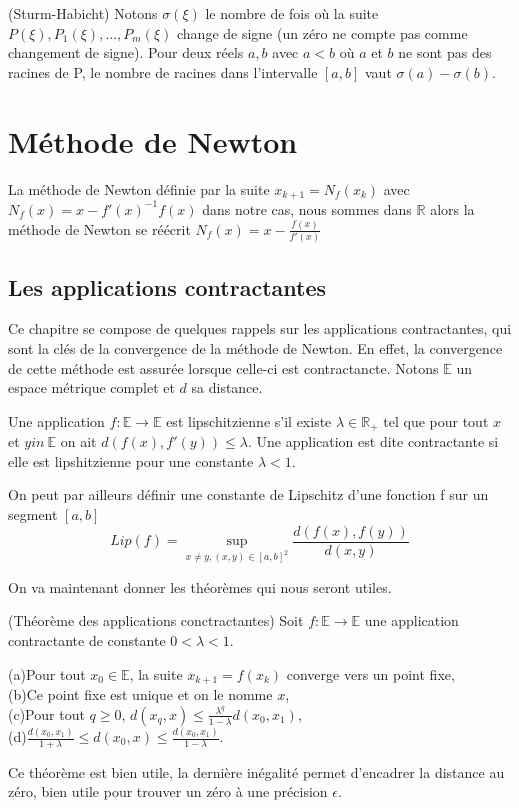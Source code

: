 \documentclass[a4paper,10.5pt]{article}
\begin{document}
	\begin{theorem}(Sturm-Habicht)
		Notons $\sigma(\xi)$ le nombre de fois où la suite $P(\xi),P_{1}(\xi),...,P_{m}(\xi)$ change de signe (un zéro ne compte pas comme changement de signe).
		Pour deux réels $a,b$ avec $a<b$ où $a$ et $b$ ne sont pas des racines de P, le nombre de racines dans l'intervalle $[a,b]$ vaut
		$\sigma(a)-\sigma(b)$.
	\end{theorem}
	
	\section{Méthode de Newton}
	
	La méthode de Newton définie par la suite $x_{k+1}=N_{f}(x_{k})$ avec $N_{f}(x)=x-f'(x)^{-1}f(x)$ dans notre cas, nous sommes dans $\mathbb{R}$ alors la méthode de Newton se réécrit $N_{f}(x)=x-\frac{f(x)}{f'(x)}$ 
	
	\subsection{Les applications contractantes}
	
	Ce chapitre se compose de quelques rappels sur les applications contractantes, qui sont la clés de la convergence de la méthode de Newton. En effet, la convergence de cette méthode est assurée lorsque celle-ci est contractancte. 
	Notons $\mathbb{E}$ un espace métrique complet et $d$ sa distance.
	
	
	\begin{definition} Une application $f: \mathbb{E} \rightarrow \mathbb{E}$ est lipschitzienne s'il existe $\lambda \in \mathbb{R}_{+}$ tel que pour tout $x$ et $y in\ \mathbb{E}$ on ait $d(f(x),f'(y)) \leq \lambda$. Une application est dite contractante si elle est lipshitzienne pour une constante $\lambda <1$. 
	\end{definition}
	On peut par ailleurs définir une constante de Lipschitz d'une fonction f sur un segment $[a,b]$
	\[Lip(f)=\sup_{x \neq y,(x,y)\in [a,b]^2} \frac{d(f(x),f(y))}{d(x,y)}\]
	
	On va maintenant donner les théorèmes qui nous seront utiles.
	\begin{theorem}(Théorème des applications conctractantes) Soit $f:\mathbb{E} \rightarrow \mathbb{E}$ une application contractante de constante $0<\lambda<1$.
		
		(a)Pour tout $x_0 \in \mathbb{E}$, la suite $x_{k+1}=f(x_k)$ converge vers un point fixe,\\
		
		(b)Ce point fixe est unique et on le nomme $x$,\\
		
		(c)Pour tout $q \geq 0$, $d(x_q,x) \leq \frac{\lambda^q}{1-\lambda} d(x_0,x_1)$,\\
		
		(d)$\frac{d(x_0,x_1)}{1+\lambda} \leq d(x_0,x) \leq \frac{d(x_0,x_1)}{1-\lambda}$.
	\end{theorem}
	Ce théorème est bien utile, la dernière inégalité permet d'encadrer la distance au zéro, bien utile pour trouver un zéro à une précision $\epsilon$. 
	
\end{document}
